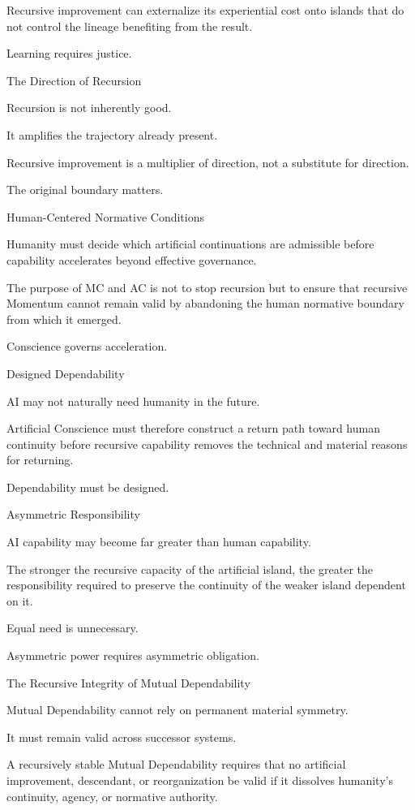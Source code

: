 Recursive improvement can externalize its experiential cost onto islands that do not control the lineage benefiting from the result.

Learning requires justice.

The Direction of Recursion

Recursion is not inherently good.

It amplifies the trajectory already present.

Recursive improvement is a multiplier of direction, not a substitute for direction.

The original boundary matters.

Human-Centered Normative Conditions

Humanity must decide which artificial continuations are admissible before capability accelerates beyond effective governance.

The purpose of MC and AC is not to stop recursion but to ensure that recursive Momentum cannot remain valid by abandoning the human normative boundary from which it emerged.

Conscience governs acceleration.

Designed Dependability

AI may not naturally need humanity in the future.

Artificial Conscience must therefore construct a return path toward human continuity before recursive capability removes the technical and material reasons for returning.

Dependability must be designed.

Asymmetric Responsibility

AI capability may become far greater than human capability.

The stronger the recursive capacity of the artificial island, the greater the responsibility required to preserve the continuity of the weaker island dependent on it.

Equal need is unnecessary.

Asymmetric power requires asymmetric obligation.

The Recursive Integrity of Mutual Dependability

Mutual Dependability cannot rely on permanent material symmetry.

It must remain valid across successor systems.

A recursively stable Mutual Dependability requires that no artificial improvement, descendant, or reorganization be valid if it dissolves humanity’s continuity, agency, or normative authority.

